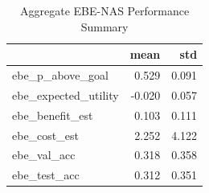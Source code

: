 \begin{table}
\caption{Aggregate EBE-NAS Performance Summary}
\label{tab:ebe_summary}
\begin{tabular}{lrr}
\toprule
 & mean & std \\
\midrule
ebe_p_above_goal & 0.529 & 0.091 \\
ebe_expected_utility & -0.020 & 0.057 \\
ebe_benefit_est & 0.103 & 0.111 \\
ebe_cost_est & 2.252 & 4.122 \\
ebe_val_acc & 0.318 & 0.358 \\
ebe_test_acc & 0.312 & 0.351 \\
\bottomrule
\end{tabular}
\end{table}
